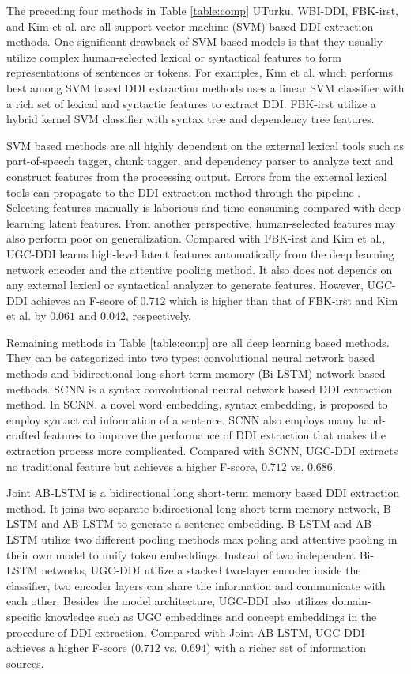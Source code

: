 \documentclass[conference]{IEEEtran}
\begin{document}
The preceding four methods in Table \ref{table:comp} UTurku, WBI-DDI, FBK-irst, and Kim et al. are all support vector machine (SVM) based DDI extraction methods.
One significant drawback of SVM based models is that they usually utilize complex human-selected lexical or
syntactical features to form representations of sentences or tokens.
For examples, Kim et al. which performs best among SVM based DDI extraction methods uses a linear SVM classifier
with a rich set of lexical and syntactic features to extract DDI.
FBK-irst utilize a hybrid kernel SVM classifier with syntax tree and dependency tree features.

SVM based methods are all highly dependent on the external lexical tools such as part-of-speech tagger,
chunk tagger, and dependency parser to analyze text and construct features from the processing output.
Errors from the external lexical tools can propagate to the DDI extraction method through the pipeline \cite{jiao_chinese_2018}.
Selecting features manually is laborious and time-consuming compared with deep learning latent features.
From another perspective, human-selected features may also perform poor on generalization.
Compared with FBK-irst and Kim et al., UGC-DDI learns high-level latent features automatically from the deep learning network encoder
and the attentive pooling method.
It also does not depends on any external lexical or syntactical analyzer to generate features.
However, UGC-DDI achieves an F-score of $0.712$ which is higher than that of FBK-irst and Kim et al. by $0.061$ and $0.042$, respectively.

Remaining methods in Table \ref{table:comp} are all deep learning based methods.
They can be categorized into two types: convolutional neural network based methods and bidirectional long short-term memory (Bi-LSTM) network based methods.
SCNN \cite{zhao_drug_2016} is a syntax convolutional neural network based DDI extraction method.
In SCNN, a novel word embedding, syntax embedding, is proposed to employ syntactical information of a sentence.
SCNN also employs many hand-crafted features to improve the performance of DDI extraction that makes the extraction process more complicated.
Compared with SCNN, UGC-DDI extracts no traditional feature but achieves a higher F-score, $0.712$ vs. $0.686$.

Joint AB-LSTM is a bidirectional long short-term memory based DDI extraction method.
It joins two separate bidirectional long short-term memory network, B-LSTM and AB-LSTM to generate a sentence embedding.
B-LSTM and AB-LSTM utilize two different pooling methods max poling and attentive pooling in their own model to unify token embeddings.
Instead of two independent Bi-LSTM networks, UGC-DDI utilize a stacked two-layer encoder inside the classifier,
two encoder layers can share the information and communicate with each other.
Besides the model architecture, UGC-DDI also utilizes domain-specific knowledge such as UGC embeddings and concept embeddings
in the procedure of DDI extraction.
Compared with Joint AB-LSTM, UGC-DDI achieves a higher F-score ($0.712$ vs. $0.694$) with a richer set of information sources.
\end{document}

